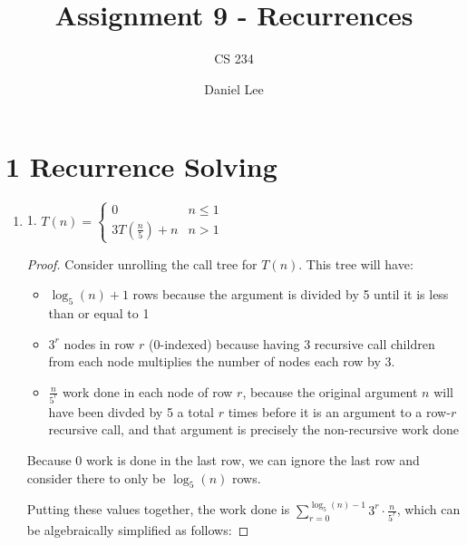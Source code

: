 \documentclass[10pt]{article}
\title{Assignment 9 - Recurrences}
\author{CS 234}
\date{Daniel Lee}
\begin{document}
\maketitle

\section*{1 \quad Recurrence Solving}

\begin{enumerate}[label={}]
      \item 1. $T(n)= \begin{cases}0 & n \leq 1 \\ 3 T\left(\frac{n}{5}\right)+n & n>1\end{cases}$

            \begin{proof}
                  Consider unrolling the call tree for $T(n)$. This tree will have:
                  \begin{itemize}
                        \item $\log _5(n)+1$ rows because the argument is divided by 5 until it is less than or equal to 1
                        \item $3^r$ nodes in row $r$ (0-indexed) because having 3 recursive call children from each node multiplies the number of nodes each row by 3.
                        \item $\frac{n}{5^r}$ work done in each node of row $r$, because the original argument $n$ will have been divded by 5 a total $r$ times before it is an argument to a row-$r$ recursive call, and that argument is precisely the non-recursive work done
                  \end{itemize}
                  Because 0 work is done in the last row, we can ignore the last row and consider there to only be $\log _5(n)$ rows.

                  Putting these values together, the work done is $\sum_{r=0}^{\log _5(n)-1} 3^r \cdot \frac{n}{5^r}$, which can be algebraically simplified as follows:


\end{proof}
\end{enumerate}
\end{document}

